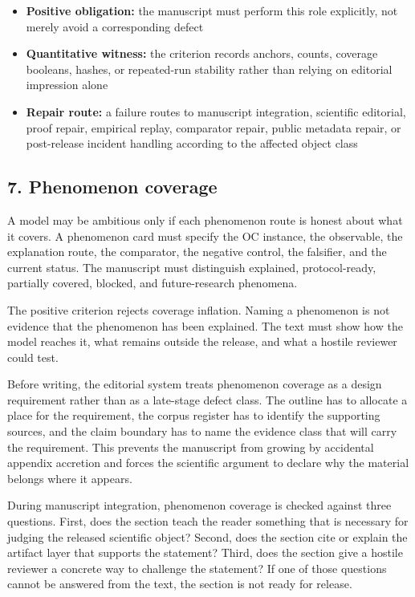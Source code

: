 \begin{itemize}[leftmargin=1.8em]

\item \textbf{Positive obligation:} the manuscript must perform this role explicitly, not merely avoid a corresponding defect

\item \textbf{Quantitative witness:} the criterion records anchors, counts, coverage booleans, hashes, or repeated-run stability rather than relying on editorial impression alone

\item \textbf{Repair route:} a failure routes to manuscript integration, scientific editorial, proof repair, empirical replay, comparator repair, public metadata repair, or post-release incident handling according to the affected object class

\end{itemize}

\subsection{7. Phenomenon coverage}

A model may be ambitious only if each phenomenon route is honest about what it covers. A phenomenon card must specify the OC instance, the observable, the explanation route, the comparator, the negative control, the falsifier, and the current status. The manuscript must distinguish explained, protocol-ready, partially covered, blocked, and future-research phenomena.


The positive criterion rejects coverage inflation. Naming a phenomenon is not evidence that the phenomenon has been explained. The text must show how the model reaches it, what remains outside the release, and what a hostile reviewer could test.


Before writing, the editorial system treats phenomenon coverage as a design requirement rather than as a late-stage defect class. The outline has to allocate a place for the requirement, the corpus register has to identify the supporting sources, and the claim boundary has to name the evidence class that will carry the requirement. This prevents the manuscript from growing by accidental appendix accretion and forces the scientific argument to declare why the material belongs where it appears.


During manuscript integration, phenomenon coverage is checked against three questions. First, does the section teach the reader something that is necessary for judging the released scientific object? Second, does the section cite or explain the artifact layer that supports the statement? Third, does the section give a hostile reviewer a concrete way to challenge the statement? If one of those questions cannot be answered from the text, the section is not ready for release.


